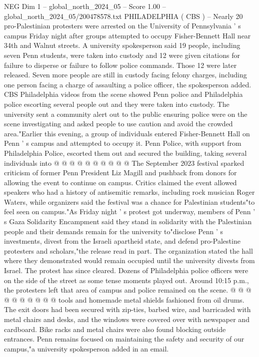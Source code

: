 \begin{textsample}{NEG Dim 1 – global\_north\_2024\_05 – Score 1.00 – global\_north\_2024\_05/200478578.txt}  \label{ex:f1_neg_170}
PHILADELPHIA ( CBS ) -- Nearly 20 pro-Palestinian protesters were arrested on the University of Pennsylvania ' s campus Friday night after groups attempted to occupy Fisher-Bennett Hall near 34th and Walnut streets.
A university spokesperson said 19 people, including seven Penn students, were taken into custody and 12 were given citations for failure to disperse or failure to follow police commands.
Those 12 were later released.
Seven more people are still in custody facing felony charges, including one person facing a charge of assaulting a police officer, the spokesperson added.
CBS Philadelphia videos from the scene showed Penn police and Philadelphia police escorting several people out and they were taken into custody.
The university sent a community alert out to the public ensuring police were on the scene investigating and asked people to use caution and avoid the crowded area."Earlier this evening, a group of individuals entered Fisher-Bennett Hall on Penn ' s campus and attempted to occupy it.
Penn Police, with support from Philadelphia Police, escorted them out and secured the building, taking several individuals into @ @ @ @ @ @ @ @ @ @ The September 2023 festival sparked criticism of former Penn President Liz Magill and pushback from donors for allowing the event to continue on campus.
Critics claimed the event allowed speakers who had a history of antisemitic remarks, including rock musician Roger Waters, while organizers said the festival was a chance for Palestinian students"to feel seen on campus."As Friday night ' s protest got underway, members of Penn ' s Gaza Solidarity Encampment said they stand in solidarity with the Palestinian people and their demands remain for the university to"disclose Penn ' s investments, divest from the Israeli apartheid state, and defend pro-Palestine protesters and scholars,"the release read in part.
The organization stated the hall where they demonstrated would remain occupied until the university divests from Israel.
The protest has since cleared.
Dozens of Philadelphia police officers were on the side of the street as some tense moments played out.
Around 10:15 p.m., the protesters left that area of campus and police remained on the scene. @ @ @ @ @ @ @ @ @ @ tools and homemade metal shields fashioned from oil drums.
The exit doors had been secured with zip-ties, barbed wire, and barricaded with metal chairs and desks, and the windows were covered over with newspaper and cardboard.
Bike racks and metal chairs were also found blocking outside entrances.
Penn remains focused on maintaining the safety and security of our campus,"a university spokesperson added in an email.

\end{textsample}
